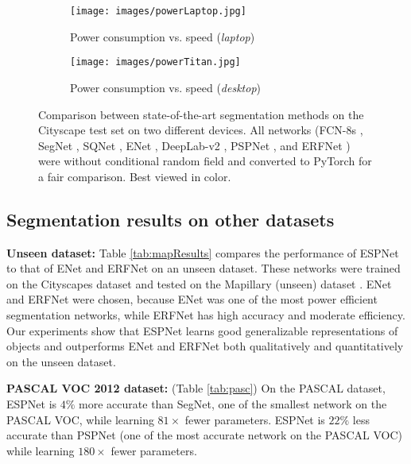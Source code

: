 \documentclass[runningheads]{llncs}
\begin{document}
\begin{figure}[t!]
\begin{subfigure}[b]{0.48\columnwidth}
\end{subfigure}
\vspace{2mm}
\begin{subfigure}[b]{0.48\columnwidth}
\centering
\texttt{[image: images/powerLaptop.jpg]}
\caption{Power consumption vs. speed (\textit{laptop})}
\label{fig:powerLap}
\end{subfigure}
\hfill
\begin{subfigure}[b]{0.5\columnwidth}
\centering
\texttt{[image: images/powerTitan.jpg]}
\caption{Power consumption vs. speed (\textit{desktop})}
\label{fig:powerDesk}
\end{subfigure}
\caption{Comparison between state-of-the-art segmentation methods on the Cityscape test set on two different devices. All networks (FCN-8s \cite{long2015fully}, SegNet \cite{badrinarayanan2017segnet}, SQNet \cite{treml2016speeding}, ENet \cite{paszke2016enet}, DeepLab-v2 \cite{chen2016deeplab}, PSPNet \cite{zhao2017pyramid}, and ERFNet \cite{romera2018erfnet}) were without conditional random field and converted to PyTorch for a fair comparison. Best viewed in color.}
\label{fig:compareSt}
\end{figure}

\subsection{Segmentation results on other datasets}
\label{ssec:mapillary}
\noindent \textbf{Unseen dataset:} Table \ref{tab:mapResults} compares the performance of ESPNet to that of ENet \cite{paszke2016enet} and ERFNet \cite{romera2018erfnet} on an unseen dataset. These networks were trained on the Cityscapes dataset \cite{cordts2016cityscapes} and tested on the Mapillary (unseen) dataset \cite{MVD2017}. ENet and ERFNet were chosen, because ENet was one of the most power efficient segmentation networks, while ERFNet has high accuracy and moderate efficiency. Our experiments show that ESPNet learns good generalizable representations of objects and outperforms ENet and ERFNet both qualitatively and quantitatively on the unseen dataset.

\noindent \textbf{PASCAL VOC 2012 dataset:} (Table \ref{tab:pasc}) On the PASCAL dataset, ESPNet is $4\%$ more accurate than SegNet, one of the smallest network on the PASCAL VOC, while learning $81\times$ fewer parameters. ESPNet is $22\%$ less accurate than PSPNet (one of the most accurate network on the PASCAL VOC) while learning $180\times$ fewer parameters.
\end{document}
